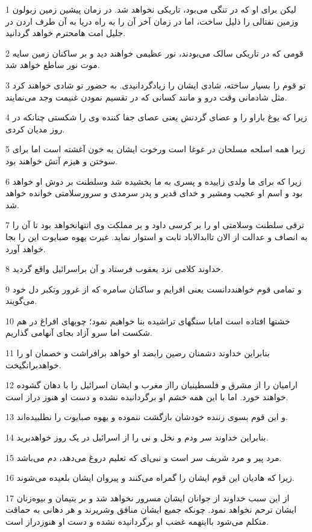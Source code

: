 \par 1 لیکن برای او که در تنگی می‌بود، تاریکی نخواهد شد. در زمان پیشین زمین زبولون وزمین نفتالی را ذلیل ساخت، اما در زمان آخر آن را به راه دریا به آن طرف اردن در جلیل امت هامحترم خواهد گردانید.
\par 2 قومی که در تاریکی سالک می‌بودند، نور عظیمی خواهند دید و بر ساکنان زمین سایه موت نور ساطع خواهد شد.
\par 3 تو قوم را بسیار ساخته، شادی ایشان را زیادگردانیدی. به حضور تو شادی خواهند کرد مثل شادمانی وقت درو و مانند کسانی که در تقسیم نمودن غنیمت وجد می‌نمایند.
\par 4 زیرا که یوغ باراو را و عصای گردنش یعنی عصای جفا کننده وی را شکستی چنانکه در روز مدیان کردی.
\par 5 زیرا همه اسلحه مسلحان در غوغا است ورخوت ایشان به خون آغشته است اما برای سوختن و هیزم آتش خواهند بود.
\par 6 زیرا که برای ما ولدی زاییده و پسری به ما بخشیده شد وسلطنت بر دوش او خواهد بود و اسم او عجیب ومشیر و خدای قدیر و پدر سرمدی و سرورسلامتی خوانده خواهد شد.
\par 7 ترقی سلطنت وسلامتی او را بر کرسی داود و بر مملکت وی انتهانخواهد بود تا آن را به انصاف و عدالت از الان تاابدالاباد ثابت و استوار نماید. غیرت یهوه صبایوت این را بجا خواهد آورد.
\par 8 خداوند کلامی نزد یعقوب فرستاد و آن براسرائیل واقع گردید.
\par 9 و تمامی قوم خواهنددانست یعنی افرایم و ساکنان سامره که از غرور وتکبر دل خود می‌گویند.
\par 10 خشتها افتاده است امابا سنگهای تراشیده بنا خواهیم نمود؛ چوبهای افراغ در هم شکست اما سرو آزاد بجای آنهامی گذاریم.
\par 11 بنابراین خداوند دشمنان رصین رابضد او خواهد برافراشت و خصمان او را خواهدبرانگیخت.
\par 12 ارامیان را از مشرق و فلسطینیان رااز مغرب و ایشان اسرائیل را با دهان گشوده خواهند خورد. اما با این همه خشم او برگردانیده نشده و دست او هنوز دراز است.
\par 13 و این قوم بسوی زننده خودشان بازگشت ننموده و یهوه صبایوت را نطلبیده‌اند.
\par 14 بنابراین خداوند سر ودم و نخل و نی را از اسرائیل در یک روز خواهدبرید.
\par 15 مرد پیر و مرد شریف سر است و نبی‌ای که تعلیم دروغ می‌دهد، دم می‌باشد.
\par 16 زیرا که هادیان این قوم ایشان را گمراه می‌کنند و پیروان ایشان بلعیده می‌شوند.
\par 17 از این سبب خداوند از جوانان ایشان مسرور نخواهد شد و بر یتیمان و بیوه‌زنان ایشان ترحم نخواهد نمود. چونکه جمیع ایشان منافق وشریرند و هر دهانی به حماقت متکلم می‌شود بااینهمه غضب او برگردانیده نشده و دست او هنوزدراز است.
